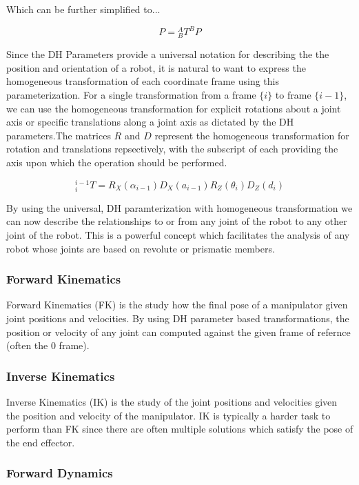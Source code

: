 \documentclass[journal]{IEEEtran}
\begin{document}
Which can be further simplified to...

$$
P={ }_{B}^{A} T^{B} P
$$

Since the DH Parameters provide a universal notation for describing the the position and orientation of a robot, it is natural to want to express the homogeneous transformation of each coordinate frame using this parameterization. For a single transformation from a frame $\{ i\}$ to frame $\{ i-1 \}$, we can use the homogeneous transformation for explicit rotations about a joint axis or specific translations along a joint axis as dictated by the DH parameters.The matrices $R$ and $D$ represent the homogeneous transformation for rotation and translations repsectively, with the subscript of each providing the axis upon which the operation should be performed.

$$
{ }_{i}^{i-1} T=R_{X}\left(\alpha_{i-1}\right) D_{X}\left(a_{i-1}\right) R_{Z}\left(\theta_{i}\right) D_{Z}\left(d_{i}\right)
$$


By using the universal, DH paramterization with homogeneous transformation we can now describe the relationships to or from any joint of the robot to any other joint of the robot. This is a powerful concept which facilitates the analysis of any robot whose joints are based on revolute or prismatic members.





\subsubsection{Forward Kinematics}
Forward Kinematics (FK) is the study how the final pose of a manipulator given joint positions and velocities. By using DH parameter based transformations, the position or velocity of any joint can computed against the given frame of refernce (often the {0} frame).


\subsubsection{Inverse Kinematics}

Inverse Kinematics (IK) is the study of the joint positions and velocities given the position and velocity of the manipulator. IK is typically a harder task to perform than FK since there are often multiple solutions which satisfy the pose of the end effector.


\subsubsection{Forward Dynamics}
\end{document}
